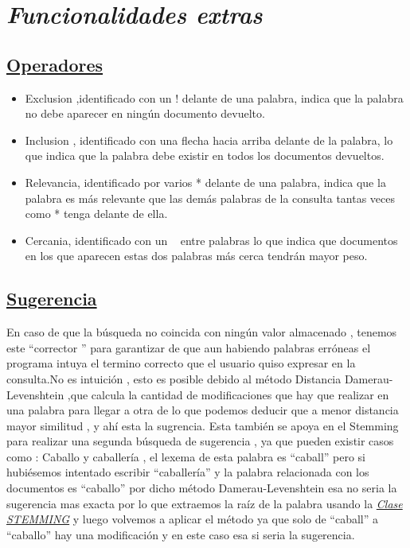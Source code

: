\documentclass{article}%
\begin{document}
\section{\emph{{Funcionalidades extras}}}
\subsection{\underline{Operadores}}

\begin{itemize}
    \item Exclusion ,identificado con un ! delante de una palabra, indica que la palabra no debe aparecer en ningún documento devuelto.
\item Inclusion , identificado con una flecha hacia arriba delante de la palabra, lo que indica que la palabra debe existir en todos los documentos devueltos.
\item Relevancia, identificado por varios * delante de una palabra, indica que la palabra es más relevante que las demás palabras de la consulta tantas veces como * tenga delante de ella.
\item Cercania, identificado con un ~ entre palabras lo que indica que documentos en los que aparecen estas dos palabras más cerca tendrán mayor peso.
\end{itemize}

\subsection{\underline{Sugerencia}}
En caso de que la búsqueda no coincida con ningún valor almacenado , tenemos este “corrector ” para garantizar de que aun habiendo palabras erróneas el programa intuya el termino correcto que el usuario quiso expresar en la consulta.No es intuición , esto es posible debido al método Distancia Damerau-Levenshtein ,que calcula la cantidad de modificaciones que hay que realizar en una palabra para llegar a otra de lo que podemos deducir que a menor distancia mayor similitud , y ahí esta la sugrencia.
Esta también se apoya en el Stemming para realizar una segunda búsqueda de sugerencia , ya que pueden existir casos como :
Caballo y caballería , el lexema de esta palabra es “caball” pero si hubiésemos intentado escribir “caballería” y la palabra relacionada con los documentos es “caballo” por dicho método Damerau-Levenshtein esa no seria la sugerencia mas exacta por lo que extraemos la raíz de la palabra usando la \emph{\underline{Clase STEMMING}} y luego volvemos a aplicar el método ya que solo de “caball” a “caballo” hay una modificación y en este caso esa si seria la sugerencia.
\end{document}
